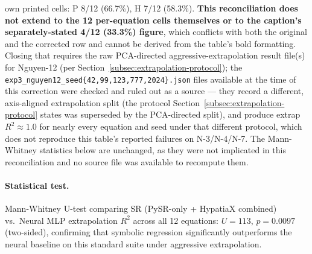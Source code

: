 \documentclass[twoside,11pt]{article}
\newcommand{\Rsq}{R^{2}}
\begin{document}
\begin{table}[h]
\begin{threeparttable}
\begin{tablenotes}
    own printed cells: P 8/12 (66.7\%), H 7/12 (58.3\%). \textbf{This
    reconciliation does not extend to the 12 per-equation cells themselves or
    to the caption's separately-stated 4/12 (33.3\%) figure}, which conflicts
    with both the original and the corrected row and cannot be derived from
    the table's bold formatting. Closing that requires the raw PCA-directed
    aggressive-extrapolation result file(s) for Nguyen-12 (per
    Section~\ref{subsec:extrapolation-protocol}); the
    \texttt{exp3\_nguyen12\_seed\{42,99,123,777,2024\}.json} files available
    at the time of this correction were checked and ruled out as a source ---
    they record a different, axis-aligned extrapolation split (the protocol
    Section~\ref{subsec:extrapolation-protocol} states was superseded by the
    PCA-directed split), and produce extrap $\Rsq\approx1.0$ for nearly every
    equation and seed under that different protocol, which does not
    reproduce this table's reported failures on N-3/N-4/N-7. The
    Mann-Whitney statistics below are unchanged, as they were not implicated
    in this reconciliation and no source file was available to recompute them.
\end{tablenotes}
\end{threeparttable}
\end{table}

\paragraph{Statistical test.}
Mann-Whitney U-test comparing SR (PySR-only + HypatiaX combined) vs.\ Neural MLP
extrapolation $\Rsq$ across all 12 equations: $U=113$, $p=0.0097$ (two-sided),
confirming that symbolic regression significantly outperforms the neural baseline
on this standard suite under aggressive extrapolation.
\end{document}
